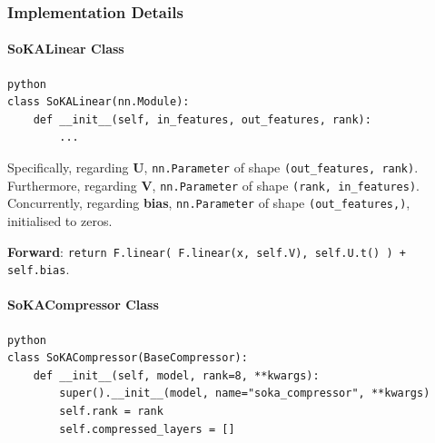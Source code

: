 \subsubsection*{Implementation Details}

\paragraph{SoKALinear Class}

\vspace{0.5em}
\begin{mdframed}[backgroundcolor=codebg, linecolor=codeframe, linewidth=1pt, roundcorner=4pt, innerleftmargin=2pt, innerrightmargin=5pt, innertopmargin=5pt, innerbottommargin=5pt]
\begin{lstlisting}
python
class SoKALinear(nn.Module):
    def __init__(self, in_features, out_features, rank):
        ...
\end{lstlisting}
\end{mdframed}
\vspace{0.5em}

Specifically, regarding \textbf{U}, \texttt{nn.Parameter} of shape \texttt{(out\_features, rank)}. Furthermore, regarding \textbf{V}, \texttt{nn.Parameter} of shape \texttt{(rank, in\_features)}. Concurrently, regarding \textbf{bias}, \texttt{nn.Parameter} of shape \texttt{(out\_features,)}, initialised to zeros.


\textbf{Forward}: \texttt{return F.linear( F.linear(x, self.V), self.U.t() ) + self.bias}.

\paragraph{SoKACompressor Class}

\vspace{0.5em}
\begin{mdframed}[backgroundcolor=codebg, linecolor=codeframe, linewidth=1pt, roundcorner=4pt, innerleftmargin=2pt, innerrightmargin=5pt, innertopmargin=5pt, innerbottommargin=5pt]
\begin{lstlisting}
python
class SoKACompressor(BaseCompressor):
    def __init__(self, model, rank=8, **kwargs):
        super().__init__(model, name="soka_compressor", **kwargs)
        self.rank = rank
        self.compressed_layers = []
\end{lstlisting}
\end{mdframed}
\vspace{0.5em}

